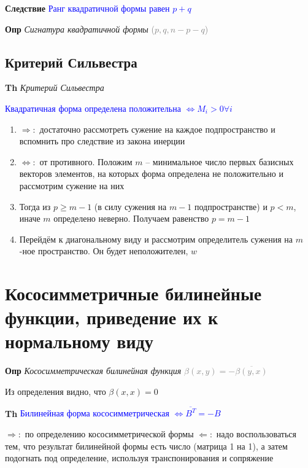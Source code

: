 \documentclass[a4paper, 14pt]{article}
\begin{document}
    \textbf{Следствие} \textcolor{blue}{Ранг квадратичной формы равен $p + q$}
    
    \textbf{Опр} \textit{Сигнатура квадратичной формы} \textcolor{gray}{($p, q, n - p - q$)}
    
    \subsection{Критерий Сильвестра}
    
    \textbf{Th} \textit{Критерий Сильвестра}
    
    \textcolor{blue}{Квадратичная форма определена положительна $\Leftrightarrow M_i > 0 \forall i$}
    
    \begin{enumerate}
        \item $\Rightarrow:$ достаточно рассмотреть сужение на каждое подпространство и вспомнить про следствие из
        закона инерции
        \item $\Leftrightarrow:$ от противного.
        Положим $m$ -- минимальное число первых базисных векторов элементов, на которых форма определена не
        положительно и рассмотрим сужение на них
        \item Тогда из $p \geq m - 1$ (в силу сужения на $m - 1$ подпространстве) и $p < m$, иначе $m$ определено
        неверно.
        Получаем равенство $p = m - 1$
        \item Перейдём к диагональному виду и рассмотрим определитель сужения на $m$-ное пространство.
        Он будет неположителен, $w$
    \end{enumerate}
    
    \section{Кососимметричные билинейные функции, приведение их к нормальному виду}
    
    \textbf{Опр} \textit{Кососимметрическая билинейная функция} \textcolor{gray}{$\beta (x, y) = - \overline{\beta (y, x)}$}
    
    Из определения видно, что $\beta (x, x) = 0$
    
    \textbf{Th} \textcolor{blue}{Билинейная форма кососимметрическая $\Leftrightarrow \overline{B^T}= -B$}
    
    $\Rightarrow:$ по определению кососимметрической формы
    $\Leftarrow:$ надо воспользоваться тем, что результат билинейной формы есть число (матрица 1 на 1), а затем
    подогнать под определение, используя транспонирования и сопряжение
    
\end{document}
